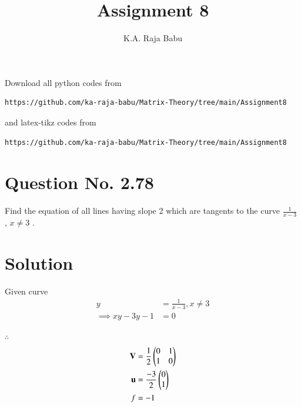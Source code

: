 \documentclass[journal,12pt,twocolumn]{IEEEtran}
\begin{document}
     \def\rightbox#1{\makebox[0in][r]{#1}}
     \def\centbox#1{\makebox[0in]{#1}}
     \def\topbox#1{\raisebox{-\baselineskip}[0in][0in]{#1}}
     \def\midbox#1{\raisebox{-0.5\baselineskip}[0in][0in]{#1}}
\vspace{3cm}
\title{Assignment 8}
\author{K.A. Raja Babu}
\maketitle
\newpage
\bigskip
\renewcommand{\thefigure}{\theenumi}
\renewcommand{\thetable}{\theenumi}
Download all python codes from 
\begin{lstlisting}
https://github.com/ka-raja-babu/Matrix-Theory/tree/main/Assignment8
\end{lstlisting}
%
and latex-tikz codes from 
%
\begin{lstlisting}
https://github.com/ka-raja-babu/Matrix-Theory/tree/main/Assignment8
\end{lstlisting}
%
\section{Question No. 2.78}
Find the equation of all lines having slope 2 which are tangents to the curve $\frac{1}{x-3}$ , $x \neq 3$ .
%
\section{Solution}
Given curve  
\begin{align}
    y &= \frac{1}{x-3} , x \neq 3 \label{giveneq}
    \\
    \implies xy - 3y - 1 &= 0
\end{align}

$\therefore$
\begin{align}
    \mathbf{V} &= \frac{1}{2}\begin{pmatrix}0 & 1 \\ 1 & 0\end{pmatrix}
    \\
    \mathbf{u} &= \frac{-3}{2}\begin{pmatrix}0 \\ 1\end{pmatrix}
    \\
    f &= -1
\end{align}
\end{document}
